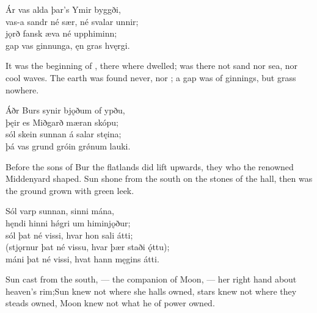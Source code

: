 \bva Ár vas alda \hld þar’s Ymir byggði,\footnotemark[1] \\%
vas-a sandr né sær, \hld né svalar unnir; \\%
jǫrð fansk æva \hld né upphiminn; \\%
gap vas ginnunga, \hld ęn gras hvęrgi.\eva
{}

\bvb It was the beginning of , there where  dwelled\footnotemark[1]; was there not sand nor sea, nor cool waves. The earth was found never, nor ; a gap was of ginnings\footnotemark[2], but grass nowhere.\evb
{}

\bva Áðr Burs synir \hld bjǫðum of ypðu, \\%
þęir es Miðgarð \hld mæran skópu; \\%
sól skein sunnan \hld á salar stęina; \\%
þá vas grund gróin \hld grǿnum lauki.\eva

\bvb Before the sons of Bur the flatlands did lift upwards, they who the renowned Middenyard shaped. Sun shone from the south on the stones of the hall, then was the ground grown with green leek.\footnotemark[1]\evb
{}

\bva Sól varp sunnan, \hld sinni mána,\footnotemark[1] \\%
hęndi hinni hǿgri \hld um himinjǫður; \\%
sól þat né vissi, \hld hvar hon sali átti; \\%
(stjǫrnur þat né vissu, \hld hvar þær staði ǫ́ttu); \\%
máni þat né vissi, \hld hvat hann męgins átti.\eva
{}

\bvb Sun cast from the south, — the companion of Moon, — her right hand about heaven’s rim;\footnotemark[1] Sun knew not where she halls owned, stars knew not where they steads owned, Moon knew not what he of power owned.\evb
{}

